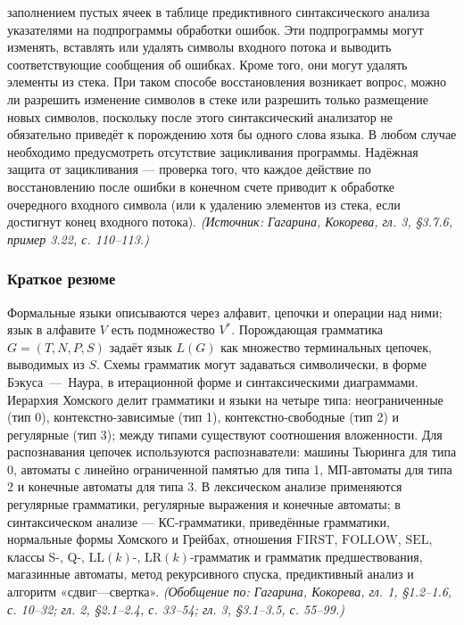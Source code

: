 \documentclass[a4paper,12pt]{article}
\begin{document}
заполнением пустых ячеек в таблице предиктивного синтаксического анализа указателями на подпрограммы обработки ошибок. Эти подпрограммы могут изменять, вставлять или удалять символы входного потока и выводить соответствующие сообщения об ошибках. Кроме того, они могут удалять элементы из стека. При таком способе восстановления возникает вопрос, можно ли разрешить изменение символов в стеке или разрешить только размещение новых символов, поскольку после этого синтаксический анализатор не обязательно приведёт к порождению хотя бы одного слова языка. В любом случае необходимо предусмотреть отсутствие зацикливания программы. Надёжная защита от зацикливания — проверка того, что каждое действие по восстановлению после ошибки в конечном счете приводит к обработке очередного входного символа (или к удалению элементов из стека, если достигнут конец входного потока).
\textit{(Источник: Гагарина, Кокорева, гл. 3, §3.7.6, пример 3.22, с. 110--113.)}

\subsubsection{Краткое резюме}

Формальные языки описываются через алфавит, цепочки и операции над ними; язык в алфавите \(V\) есть подмножество \(V^*\). Порождающая грамматика \(G=(T,N,P,S)\) задаёт язык \(L(G)\) как множество терминальных цепочек, выводимых из \(S\). Схемы грамматик могут задаваться символически, в форме Бэкуса~—~Наура, в итерационной форме и синтаксическими диаграммами. Иерархия Хомского делит грамматики и языки на четыре типа: неограниченные (тип 0), контекстно-зависимые (тип 1), контекстно-свободные (тип 2) и регулярные (тип 3); между типами существуют соотношения вложенности. Для распознавания цепочек используются распознаватели: машины Тьюринга для типа 0, автоматы с линейно ограниченной памятью для типа 1, МП-автоматы для типа 2 и конечные автоматы для типа 3. В лексическом анализе применяются регулярные грамматики, регулярные выражения и конечные автоматы; в синтаксическом анализе — КС-грамматики, приведённые грамматики, нормальные формы Хомского и Грейбах, отношения \(\mathrm{FIRST}\), \(\mathrm{FOLLOW}\), \(\mathrm{SEL}\), классы S-, Q-, \(\mathrm{LL}(k)\)-, \(\mathrm{LR}(k)\)-грамматик и грамматик предшествования, магазинные автоматы, метод рекурсивного спуска, предиктивный анализ и алгоритм «сдвиг—свертка».
\textit{(Обобщение по: Гагарина, Кокорева, гл. 1, §1.2--1.6, с. 10--32; гл. 2, §2.1--2.4, с. 33--54; гл. 3, §3.1--3.5, с. 55--99.)}
\end{document}

